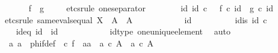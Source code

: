 \begin{isabellebody}
\ \ \ \ \isamarkupfalse%
\ {\isachardoublequoteopen}f\ {\isacharequal}{\kern0pt}\ g{\isachardoublequoteclose}\isanewline
\ \ \ \ \isamarkupfalse%
{\isacharparenleft}{\kern0pt}etcs{\isacharunderscore}{\kern0pt}rule\ one{\isacharunderscore}{\kern0pt}separator{\isacharparenright}{\kern0pt}\isanewline
\ \ \ \ \ \ \isamarkupfalse%
\ {\isachardoublequoteopen}{\isasymAnd}id{\isacharunderscore}{\kern0pt}{}{\isachardot}{\kern0pt}\ id{\isacharunderscore}{\kern0pt}{}\ {\isasymin}\isactrlsub c\ {\isasymone}\ {\isasymLongrightarrow}\ f\ {\isasymcirc}\isactrlsub c\ id{\isacharunderscore}{\kern0pt}{}\ {\isacharequal}{\kern0pt}\ g\ {\isasymcirc}\isactrlsub c\ id{\isacharunderscore}{\kern0pt}{}{\isachardoublequoteclose}\isanewline
\ \ \ \ \ \ \isamarkupfalse%
{\isacharparenleft}{\kern0pt}etcs{\isacharunderscore}{\kern0pt}rule\ same{\isacharunderscore}{\kern0pt}evals{\isacharunderscore}{\kern0pt}equal{\isacharbrackleft}{\kern0pt}\ X\ {\isacharequal}{\kern0pt}\ A{\isacharcomma}{\kern0pt}\ \ A\ {\isacharequal}{\kern0pt}\ {\isasymOmega}{\isacharbrackright}{\kern0pt}{\isacharparenright}{\kern0pt}\isanewline
\ \ \ \ \ \ \ \ \isamarkupfalse%
\ id{\isacharunderscore}{\kern0pt}{}\isanewline
\ \ \ \ \ \ \ \ \isamarkupfalse%
\ id{}{\isacharunderscore}{\kern0pt}is{\isacharcolon}{\kern0pt}\ {\isachardoublequoteopen}id{\isacharunderscore}{\kern0pt}{}\ {\isasymin}\isactrlsub c\ {\isasymone}{\isachardoublequoteclose}\isanewline
\ \ \ \ \ \ \ \ \isamarkupfalse%
\ \isamarkupfalse%
\ id{}{\isacharunderscore}{\kern0pt}eq{\isacharcolon}{\kern0pt}\ {\isachardoublequoteopen}id{\isacharunderscore}{\kern0pt}{}\ {\isacharequal}{\kern0pt}\ id{\isacharparenleft}{\kern0pt}{\isasymone}{\isacharparenright}{\kern0pt}{\isachardoublequoteclose}\isanewline
\ \ \ \ \ \ \ \ \ \ \isamarkupfalse%
\ id{\isacharunderscore}{\kern0pt}type\ one{\isacharunderscore}{\kern0pt}unique{\isacharunderscore}{\kern0pt}element\ \isamarkupfalse%
\ auto\isanewline
\isanewline
\ \ \ \ \ \ \ \ \isamarkupfalse%
\ a{}\ a{}\ \ phi{\isacharunderscore}{\kern0pt}f{\isacharunderscore}{\kern0pt}def{\isacharcolon}{\kern0pt}\ {\isachardoublequoteopen}{\isasymphi}\ {\isasymcirc}\isactrlsub c\ f\ {\isacharequal}{\kern0pt}\ {\isasymlangle}a{}{\isacharcomma}{\kern0pt}a{}{\isasymrangle}\ {\isasymand}\ a{}\ {\isasymin}\isactrlsub c\ A\ {\isasymand}\ a{}\ {\isasymin}\isactrlsub c\ A{\isachardoublequoteclose}\isanewline

\end{isabellebody}
